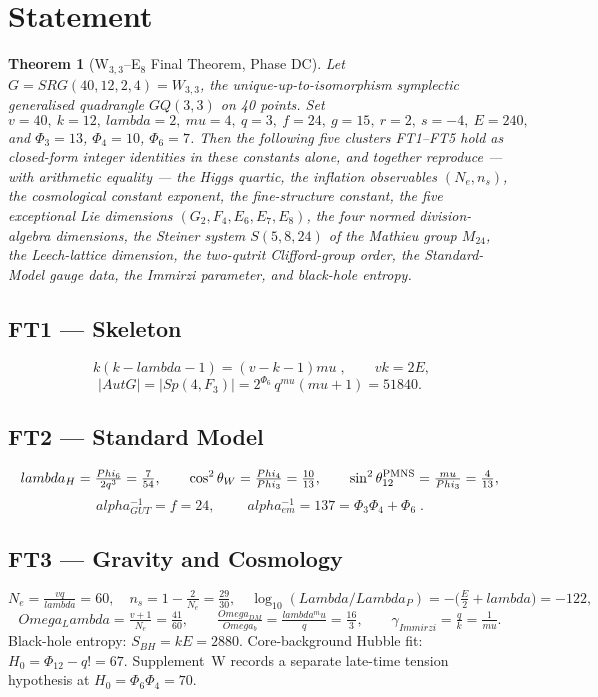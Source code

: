 \documentclass[12pt,a4paper]{article}
\def\mathbb#1{#1}%
\def\mathrm#1{#1}%
\def\textbf#1{#1}%
\def\alpha{alpha}%
\def\lambda{lambda}%
\def\Lambda{Lambda}%
\def\mu{mu}%
\def\Phi#1{Phi#1}%
\def\Omega{Omega}%
\newtheorem{theorem}{Theorem}[section]
\theoremstyle{definition}
\newcommand{\SRG}{\mathrm{SRG}}
\newcommand{\GQ}{\mathrm{GQ}}
\newcommand{\Sp}{\mathrm{Sp}}
\newcommand{\Aut}{\mathrm{Aut}}
\newcommand{\Phitwelve}{\Phi_{12}}
\newcommand{\FF}{\mathbb{F}}
\begin{document}
\section*{Statement}
\begin{theorem}[W$_{3,3}$--E$_8$ Final Theorem, Phase DC]
Let $G=\SRG(40,12,2,4)=W_{3,3}$, the unique-up-to-isomorphism symplectic
generalised quadrangle $\GQ(3,3)$ on 40 points. Set
\[
v=40,\ k=12,\ \lambda=2,\ \mu=4,\ q=3,\ f=24,\ g=15,\ r=2,\ s=-4,\ E=240,
\]
and $\Phi_3=13$, $\Phi_4=10$, $\Phi_6=7$. Then the following five
clusters \textbf{FT1--FT5} hold as closed-form integer identities in these
constants alone, and together reproduce --- with arithmetic equality --- the
Higgs quartic, the inflation observables $(N_e,n_s)$, the cosmological
constant exponent, the fine-structure constant, the five exceptional Lie
dimensions $(G_2,F_4,E_6,E_7,E_8)$, the four normed division-algebra
dimensions, the Steiner system $S(5,8,24)$ of the Mathieu group $M_{24}$,
the Leech-lattice dimension, the two-qutrit Clifford-group order, the
Standard-Model gauge data, the Immirzi parameter, and black-hole entropy.
\end{theorem}

\subsection*{FT1 --- Skeleton}
\[
\boxed{\;k(k-\lambda-1)=(v-k-1)\mu\;},\qquad vk=2E,
\]
\[
|\Aut G|=|\Sp(4,\FF_3)|=2^{\Phi_6}\,q^{\mu}(\mu+1)=51840.
\]

\subsection*{FT2 --- Standard Model}
\[
\lambda_H=\tfrac{\Phi_6}{2q^3}=\tfrac{7}{54},\qquad
\cos^2\theta_W=\tfrac{\Phi_4}{\Phi_3}=\tfrac{10}{13},\qquad
\sin^2\theta_{12}^{\rm PMNS}=\tfrac{\mu}{\Phi_3}=\tfrac{4}{13},
\]
\[
\alpha_{\mathrm{GUT}}^{-1}=f=24,\qquad
\boxed{\;\alpha_{\mathrm{em}}^{-1}=137=\Phi_3\Phi_4+\Phi_6\;}.
\]

\subsection*{FT3 --- Gravity and Cosmology}
\[
N_e=\tfrac{vq}{\lambda}=60,\quad
n_s=1-\tfrac{2}{N_e}=\tfrac{29}{30},\quad
\log_{10}(\Lambda/\Lambda_P)=-\!\bigl(\tfrac{E}{2}+\lambda\bigr)=-122,
\]
\[
\Omega_\Lambda=\tfrac{v+1}{N_e}=\tfrac{41}{60},\qquad
\tfrac{\Omega_{\mathrm{DM}}}{\Omega_b}=\tfrac{\lambda^\mu}{q}=\tfrac{16}{3},\qquad
\gamma_{\mathrm{Immirzi}}=\tfrac{q}{k}=\tfrac{1}{\mu}.
\]
Black-hole entropy: $S_{BH}=kE=2880$. Core-background Hubble fit:
$H_0=\Phitwelve-q!=67$. Supplement~W records a separate late-time
tension hypothesis at $H_0=\Phi_6\Phi_4=70$.
\end{document}
